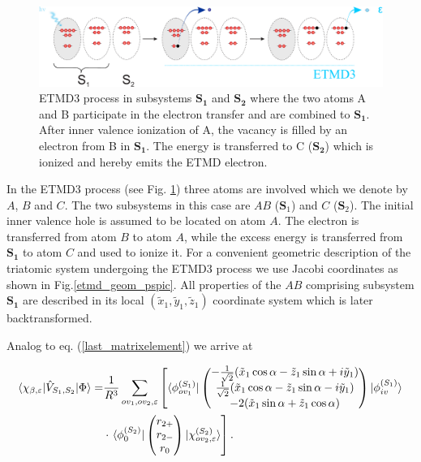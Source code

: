 \begin{figure}[ht]
\centering
\includegraphics[scale=0.30]{pics/ETMD_subsystems.pdf}
\caption{ETMD3 process in subsystems $\mathbf{S_1}$ and $\mathbf{S_2}$ where
         the two atoms A and B participate in the electron transfer and are
         combined to $\mathbf{S_1}$. After inner valence ionization of A,
         the vacancy is filled by an electron from B in $\mathbf{S_1}$.
         The energy is transferred to C ($\mathbf{S_2}$) which is ionized
         and hereby emits the ETMD electron.}
\label{fancy_ETMD}
\end{figure}

In the ETMD3 process (see Fig. \ref{fancy_ETMD}) three atoms are involved
which we denote by $A$, $B$ and $C$. The two subsystems in this case are
$AB$ ($\mathbf{S}_1$) and $C$ ($\mathbf{S}_2$). The initial inner valence
hole is assumed to be located on atom $A$. The electron is transferred
from atom $B$ to atom $A$, while the excess energy is transferred from
$\mathbf{S_1}$ to atom $C$ and used to ionize it. For a convenient
geometric description of the triatomic system undergoing the ETMD3 process
we use Jacobi coordinates as shown in Fig.\ref{etmd_geom_pspic}. All
properties of the $AB$ comprising subsystem $\mathbf{S_1}$ are described in
its local $(\tilde{x}_1, \tilde{y}_1,  \tilde{z}_1)$ coordinate system which
is later backtransformed.

Analog to eq. (\ref{last_matrixelement}) we arrive at

\begin{align}\label{last_matrixelement_etmd}
 \braket{\chi_{\beta,\varepsilon}|\hat{V}_{S_1,S_2}|\Phi} 
=& \frac{1}{R^3} \sum\limits_{ov_1,ov_2,\varepsilon}  \left[
  \braket{\phi_{ov_1}^{(S_1)}|  \begin{pmatrix}
         -\frac{1}{\sqrt{2}}(\tilde{x}_1\cos\alpha- \tilde{z}_1\sin\alpha +i\tilde{y}_1)\\
         \frac{1}{\sqrt{2}}(\tilde{x}_1\cos\alpha- \tilde{z}_1\sin\alpha -i\tilde{y}_1)\\
         -2 (\tilde{x}_1\sin\alpha + \tilde{z}_1\cos\alpha )\\
         \end{pmatrix} |\phi_{iv}^{(S_1)}} \right. \nonumber \\
  & \cdot \left. \braket{\phi_{0}^{(S_2)}| \begin{pmatrix}
                            r_{2+}\\
                            r_{2-}\\
                            r_0\\
                            \end{pmatrix} |\chi_{ov_2,\varepsilon}^{(S_2)}} \right] .
\end{align}


